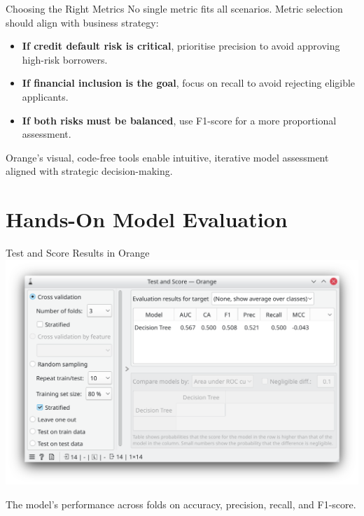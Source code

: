 \documentclass[aspectratio=169, table]{beamer}
\begin{document}
\begin{frame}{Choosing the Right Metrics}
	\vspace{10pt}
	No single metric fits all scenarios. Metric selection should align with business strategy:
	
	\begin{itemize}
		\item \textbf{If credit default risk is critical}, prioritise precision to avoid approving high-risk borrowers.
		\item \textbf{If financial inclusion is the goal}, focus on recall to avoid rejecting eligible applicants.
		\item \textbf{If both risks must be balanced}, use F1-score for a more proportional assessment.
	\end{itemize}
	
	Orange’s visual, code-free tools enable intuitive, iterative model assessment aligned with strategic decision-making.
\end{frame}

\section{Hands-On Model Evaluation}

\begin{frame}{Test and Score Results in Orange}
	\vspace{20pt}
	\centering
	\includegraphics[width=0.7\linewidth]{../../figures/decision_tree_results.png}
	
	The model’s performance across folds on accuracy, precision, recall, and F1-score.
\end{frame}
\end{document}

